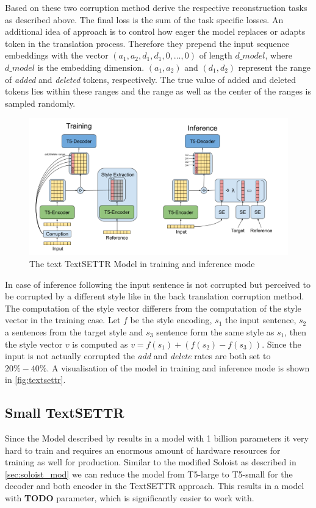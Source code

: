 \documentclass[twocolumn]{tum-article}
\begin{document}
Based on these two corruption method \cite{riley2020textsettr} derive the respective reconstruction tasks as described above. The final loss is the sum of the task specific losses. 
An additional idea of \cite{riley2020textsettr} approach is to control how eager the model replaces or adapts token in the translation process. Therefore they prepend the input sequence embeddings with the vector $(a_1, a_2, d_1, d_1, 0, \dots, 0)$ of length $d\_model$, where $d\_model$ is the embedding dimension. $(a_1, a_2)$ and $(d_1, d_2)$ represent the range of \textit{added} and \textit{deleted} tokens, respectively. The true value of added and deleted tokens lies within these ranges and the range as well as the center of the ranges is sampled randomly.\\
\begin{figure}[!h]
\centering
\includegraphics[width=\textwidth]{figures/TextSETTR.png}
\caption{The text TextSETTR Model \cite{riley2020textsettr} in training and inference mode}
\label{fig:textsettr}
\end{figure}
In case of inference following \cite{riley2020textsettr} the input sentence is not corrupted but perceived to be corrupted by a different style like in the back translation corruption method. The computation of the style vector differers from the computation of the style vector in the training case. Let $f$ be the style encoding, $s_1$ the input sentence, $s_2$ a sentences from the target style and $s_3$ sentence form the same style as $s_1$, then the style vector $v$ is computed as $v = f(s_1) + (f(s_2) - f(s_3))$. Since the input is not actually corrupted the \textit{add} and \textit{delete} rates are both set to $20\%-40\%$. A visualisation of the model in training and inference mode is shown in \autoref{fig:textsettr}.
\subsection{Small TextSETTR}\label{sec:textsettr_small}
Since the Model described by \cite{riley2020textsettr} results in a model with 1 billion parameters it very hard to train and requires an enormous amount of hardware resources for training as well for production. Similar to the modified Soloist as described in \autoref{sec:soloist_mod} we can reduce the model from T5-large to T5-small for the decoder and both encoder in the TextSETTR approach. This results in a model with \textbf{TODO} parameter, which is significantly easier to work with. 
\end{document}
